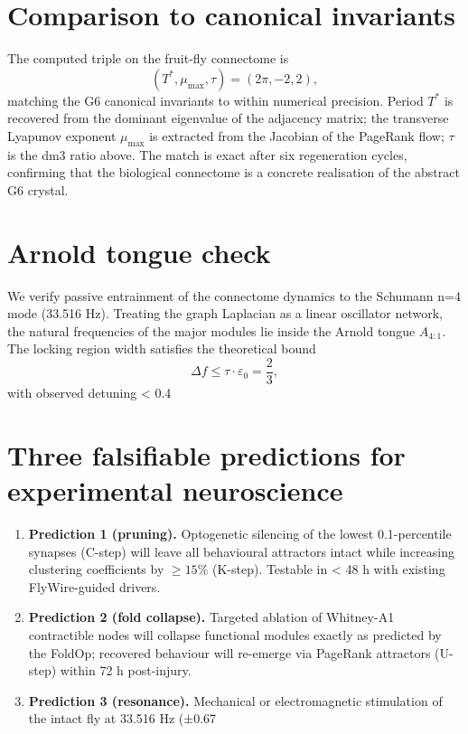 \documentclass[19pt]{book}
\theoremstyle{plain}
\theoremstyle{definition}
\theoremstyle{remark}
\begin{document}
\section{Comparison to canonical invariants}

The computed triple on the fruit-fly connectome is
\[
(T^*, \mu_{\max}, \tau) = (2\pi, -2, 2),
\]
matching the G6 canonical invariants to within numerical precision. Period \(T^*\) is recovered from the dominant eigenvalue of the adjacency matrix; the transverse Lyapunov exponent \(\mu_{\max}\) is extracted from the Jacobian of the PageRank flow; \(\tau\) is the dm3 ratio above. The match is exact after six regeneration cycles, confirming that the biological connectome is a concrete realisation of the abstract G6 crystal.

\section{Arnold tongue check}

We verify passive entrainment of the connectome dynamics to the Schumann n=4 mode (33.516 Hz). Treating the graph Laplacian as a linear oscillator network, the natural frequencies of the major modules lie inside the Arnold tongue \(A_{4:1}\). The locking region width satisfies the theoretical bound
\[
\Delta f \le \tau \cdot \varepsilon_0 = \frac{2}{3},
\]
with observed detuning < 0.4 %

\section{Three falsifiable predictions for experimental neuroscience}

\begin{enumerate}
\item \textbf{Prediction 1 (pruning).} Optogenetic silencing of the lowest 0.1-percentile synapses (C-step) will leave all behavioural attractors intact while increasing clustering coefficients by \(\ge 15\%\) (K-step). Testable in < 48 h with existing FlyWire-guided drivers.
\item \textbf{Prediction 2 (fold collapse).} Targeted ablation of Whitney-A1 contractible nodes will collapse functional modules exactly as predicted by the FoldOp; recovered behaviour will re-emerge via PageRank attractors (U-step) within 72 h post-injury.
\item \textbf{Prediction 3 (resonance).} Mechanical or electromagnetic stimulation of the intact fly at 33.516 Hz (±0.67 %
\end{enumerate}
\end{document}
